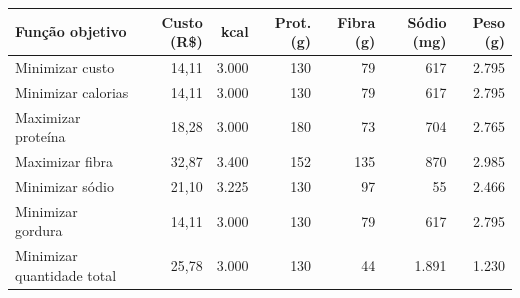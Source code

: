 \begin{tabular}{lrrrrrr}
\toprule
Função objetivo & Custo (R\$) & kcal & Prot. (g) & Fibra (g) & Sódio (mg) & Peso (g) \\
\midrule
Minimizar custo & 14{,}11 & 3.000 & 130 & 79 & 617 & 2.795 \\
Minimizar calorias & 14{,}11 & 3.000 & 130 & 79 & 617 & 2.795 \\
Maximizar proteína & 18{,}28 & 3.000 & 180 & 73 & 704 & 2.765 \\
Maximizar fibra & 32{,}87 & 3.400 & 152 & 135 & 870 & 2.985 \\
Minimizar sódio & 21{,}10 & 3.225 & 130 & 97 & 55 & 2.466 \\
Minimizar gordura & 14{,}11 & 3.000 & 130 & 79 & 617 & 2.795 \\
Minimizar quantidade total & 25{,}78 & 3.000 & 130 & 44 & 1.891 & 1.230 \\
\bottomrule
\end{tabular}
